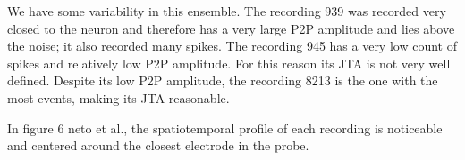 \documentclass{report}
\begin{document}
We have some variability in this ensemble. 
The recording 939 was recorded very closed to the neuron and therefore has a very large P2P amplitude and lies above the noise; it also recorded many spikes. 
The recording 945 has a very low count of spikes and relatively low P2P amplitude. For this reason its JTA is not very well defined.
Despite its low P2P amplitude, the recording 8213 is the one with the most events, making its JTA reasonable.

In figure 6 neto et al., the spatiotemporal profile of each recording is noticeable and centered around the closest electrode in the probe.
\end{document}
